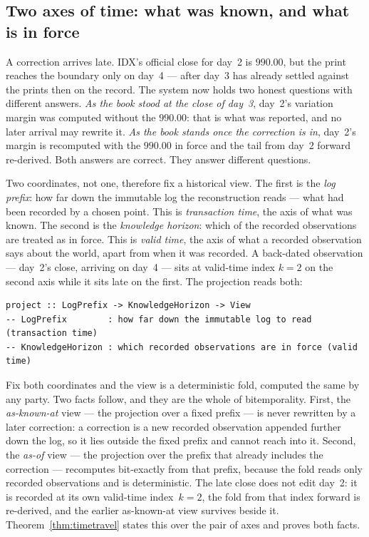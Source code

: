 \subsection{Two axes of time: what was known, and what is in force}\label{sec:bitemporal}

A correction arrives late. IDX's official close for day~2 is $990.00$, but the print
reaches the boundary only on day~4 --- after day~3 has already settled against the
prints then on the record. The system now holds two honest questions with different
answers. \emph{As the book stood at the close of day~3}, day~2's variation margin was
computed without the $990.00$: that is what was reported, and no later arrival may rewrite
it. \emph{As the book stands once the correction is in}, day~2's margin is recomputed with
the $990.00$ in force and the tail from day~2 forward re-derived. Both answers are correct.
They answer different questions.

Two coordinates, not one, therefore fix a historical view. The first is the \emph{log
prefix}: how far down the immutable log the reconstruction reads --- what had been recorded
by a chosen point. This is \emph{transaction time}, the axis of what was known. The second
is the \emph{knowledge horizon}: which of the recorded observations are treated as in
force. This is \emph{valid time}, the axis of what a recorded observation says about the
world, apart from when it was recorded. A back-dated observation --- day~2's close, arriving
on day~4 --- sits at valid-time index $k=2$ on the second axis while it sits late on the
first. The projection reads both:

\begin{lstlisting}
project :: LogPrefix -> KnowledgeHorizon -> View
-- LogPrefix        : how far down the immutable log to read   (transaction time)
-- KnowledgeHorizon : which recorded observations are in force (valid time)
\end{lstlisting}

Fix both coordinates and the view is a deterministic fold, computed the same by any party.
Two facts follow, and they are the whole of bitemporality. First, the \emph{as-known-at}
view --- the projection over a fixed prefix --- is never rewritten by a later correction: a
correction is a new recorded observation appended further down the log, so it lies outside
the fixed prefix and cannot reach into it. Second, the \emph{as-of} view --- the projection
over the prefix that already includes the correction --- recomputes bit-exactly from that
prefix, because the fold reads only recorded observations and is deterministic. The late
close does not edit day~2: it is recorded at its own valid-time index~$k=2$, the fold from
that index forward is re-derived, and the earlier as-known-at view survives beside it.
Theorem~\ref{thm:timetravel} states this over the pair of axes and proves both facts.

